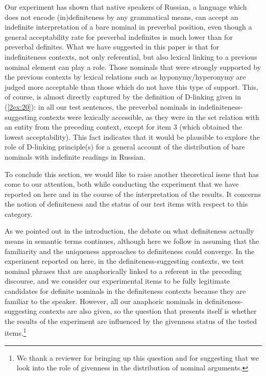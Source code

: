 \documentclass[output=paper]{langsci/langscibook}
\begin{document}
Our experiment has shown that native speakers of Russian, a language which does not encode (in)definiteness by any grammatical means, can accept an indefinite interpretation of a bare nominal in preverbal position, even though a general acceptability rate for preverbal indefinites is much lower than for preverbal definites. What we have suggested in this paper is that for indefiniteness contexts, not only referential, but also lexical linking to a previous nominal element can play a role. Those nominals that were strongly supported by the previous contexts by lexical relations such as hyponymy/hyperonymy are judged more acceptable than those which do not have this type of support. This, of course, is almost directly captured by the definition of D-linking given in (\ref{2ex:20}): in all our test sentences, the preverbal nominals in indefiniteness-suggesting contexts were lexically accessible, as they were in the set relation with an entity from the preceding context, except for item 3 (which obtained the lowest acceptability). This fact indicates that it would be plausible to explore the role of D-linking principle(s) for a general account of the distribution of bare nominals with indefinite readings in Russian.

To conclude this section, we would like to raise another theoretical issue that has come to our attention, both while conducting the experiment that we have reported on here and in the course of the interpretation of the results. It concerns the notion of definiteness and the status of our test items with respect to this category.

As we pointed out in the introduction, the debate on what definiteness actually means in semantic terms continues, although here we follow \cite{farkas:02} in assuming that the familiarity and the uniqueness approaches to definiteness could converge. In the experiment reported on here, in the definiteness-suggesting contexts, we test nominal phrases that are anaphorically linked to a referent in the preceding discourse, and we consider our experimental items to be fully legitimate candidates for definite nominals in the definiteness contexts because they are familiar to the speaker. However, all our anaphoric nominals in definiteness-suggesting contexts are also given, so the question that presents itself is whether the results of the experiment are influenced by the givenness status of the tested items.\footnote{We thank a reviewer for bringing up this question and for suggesting that we look into the role of givenness in the distribution of nominal arguments.}
\end{document}
